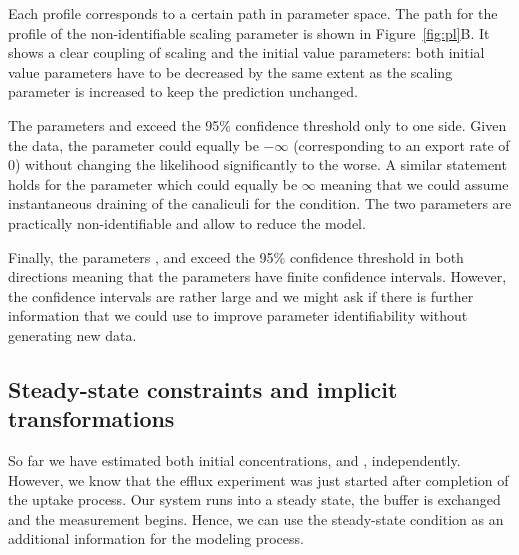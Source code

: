 \documentclass[article]{jss}
\begin{document}
Each profile corresponds to a certain path in parameter space. The path for the profile of the non-identifiable scaling parameter  is shown in Figure~\ref{fig:pl}B. It shows a clear coupling of scaling and the initial value parameters: both initial value parameters have to be decreased by the same extent as the scaling parameter is increased to keep the prediction unchanged.

The parameters  and  exceed the 95\% confidence threshold only to one side. Given the data, the  parameter could equally be $-\infty$ (corresponding to an export rate of 0) without changing the likelihood significantly to the worse. A similar statement holds for the  parameter which could equally be $\infty$ meaning that we could assume instantaneous draining of the canaliculi for the  condition. The two parameters are practically non-identifiable and allow to reduce the model.

Finally, the parameters ,  and  exceed the 95\% confidence threshold in both directions meaning that the parameters have finite confidence intervals. However, the confidence intervals are rather large and we might ask if there is further information that we could use to improve parameter identifiability without generating new data.

\subsection{Steady-state constraints and implicit transformations}

So far we have estimated both initial concentrations,  and , independently. However, we know that the efflux experiment was just started after completion of the uptake process. Our system runs into a steady state, the buffer is exchanged and the measurement begins. Hence, we can use the steady-state condition as an additional information for the modeling process.
\end{document}
